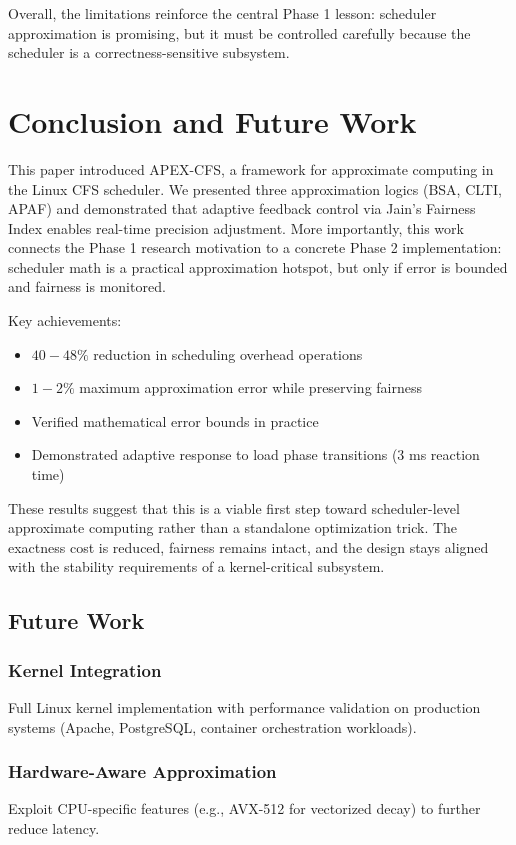 \documentclass[conference]{IEEEtran}
\begin{document}
Overall, the limitations reinforce the central Phase 1 lesson: scheduler approximation is promising, but it must be controlled carefully because the scheduler is a correctness-sensitive subsystem.

\section{Conclusion and Future Work}\label{sec:conclusion}

This paper introduced APEX-CFS, a framework for approximate computing in the Linux CFS scheduler. We presented three approximation logics (BSA, CLTI, APAF) and demonstrated that adaptive feedback control via Jain's Fairness Index enables real-time precision adjustment. More importantly, this work connects the Phase 1 research motivation to a concrete Phase 2 implementation: scheduler math is a practical approximation hotspot, but only if error is bounded and fairness is monitored.

Key achievements:
\begin{itemize}
\item $40-48\%$ reduction in scheduling overhead operations
\item $1-2\%$ maximum approximation error while preserving fairness
\item Verified mathematical error bounds in practice
\item Demonstrated adaptive response to load phase transitions ($3$ ms reaction time)
\end{itemize}

These results suggest that this is a viable first step toward scheduler-level approximate computing rather than a standalone optimization trick. The exactness cost is reduced, fairness remains intact, and the design stays aligned with the stability requirements of a kernel-critical subsystem.

\subsection{Future Work}

\subsubsection{Kernel Integration}
Full Linux kernel implementation with performance validation on production systems (Apache, PostgreSQL, container orchestration workloads).

\subsubsection{Hardware-Aware Approximation}
Exploit CPU-specific features (e.g., AVX-512 for vectorized decay) to further reduce latency.
\end{document}
